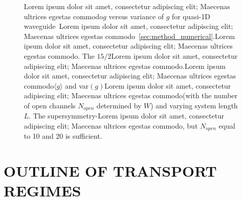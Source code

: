 \begin{figure}
\vskip -0.5cm
\centerline{
}
\vskip -0.5cm
\caption[Lorem ipsum dolor sit amet, consectetur adipiscing elit; Maecenas ultrices egestas commodo$g$ versus variance of $g$ for quasi-1D waveguide~\cite{2000_Mirlin}Lorem ipsum dolor sit amet, consectetur adipiscing elit; Maecenas ultrices egestas commodo~\ref{sec:method_numerical}.]{Lorem ipsum dolor sit amet, consectetur adipiscing elit; Maecenas ultrices egestas commodo$g$ versus variance of $g$ for quasi-1D waveguide~\cite{2000_Mirlin}Lorem ipsum dolor sit amet, consectetur adipiscing elit; Maecenas ultrices egestas commodo~\ref{sec:method_numerical}.Lorem ipsum dolor sit amet, consectetur adipiscing elit; Maecenas ultrices egestas commodo. The $15/2$Lorem ipsum dolor sit amet, consectetur adipiscing elit; Maecenas ultrices egestas commodo.Lorem ipsum dolor sit amet, consectetur adipiscing elit; Maecenas ultrices egestas commodo$\langle g \rangle$ and var$(g)$Lorem ipsum dolor sit amet, consectetur adipiscing elit; Maecenas ultrices egestas commodo(with the number of open channels $N_{open}$ determined by $W$) and varying system length $L$. The supersymmetry-Lorem ipsum dolor sit amet, consectetur adipiscing elit; Maecenas ultrices egestas commodo, but $N_{open}$ equal to 10 and 20 is sufficient.\label{fig:Mirlin_supersymmetry_g_varg}}
\end{figure}
  

\section{OUTLINE OF TRANSPORT REGIMES}
\label{sec:twod_plot}

